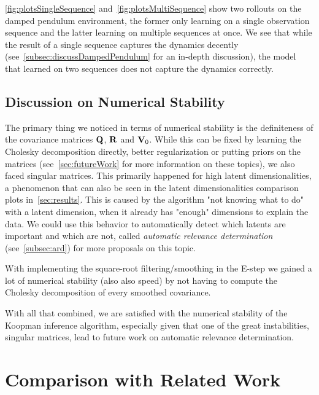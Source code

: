 		\autoref{fig:plotsSingleSequence} and~\autoref{fig:plotsMultiSequence} show two rollouts on the damped pendulum environment, the former only learning on a single observation sequence and the latter learning on multiple sequences at once. We see that while the result of a single sequence captures the dynamics decently (see~\autoref{subsec:discussDampedPendulum} for an in-depth discussion), the model that learned on two sequences does not capture the dynamics correctly.

	\subsection{Discussion on Numerical Stability}
		\label{subsec:discussPerformanceNumerics}

		The primary thing we noticed in terms of numerical stability is the definiteness of the covariance matrices \(\boldsymbol{\mathrm{Q}}\), \(\boldsymbol{\mathrm{R}}\) and \(\boldsymbol{\mathrm{V}}_0\). While this can be fixed by learning the Cholesky decomposition directly, better regularization or putting priors on the matrices (see~\autoref{sec:futureWork} for more information on these topics), we also faced singular matrices. This primarily happened for high latent dimensionalities, a phenomenon that can also be seen in the latent dimensionalities comparison plots in~\autoref{sec:results}. This is caused by the algorithm "not knowing what to do" with a latent dimension, \ie when it already has "enough" dimensions to explain the data. We could use this behavior to automatically detect which latents are important and which are not, called \emph{automatic relevance determination} (see~\autoref{subsec:ard}) for more proposals on this topic.

		With implementing the square-root filtering/smoothing in the E-step we gained a lot of numerical stability (also also speed) by not having to compute the Cholesky decomposition of every smoothed covariance.

		With all that combined, we are satisfied with the numerical stability of the Koopman inference algorithm, especially given that one of the great instabilities, singular matrices, lead to future work on automatic relevance determination.

\section{Comparison with Related Work}

